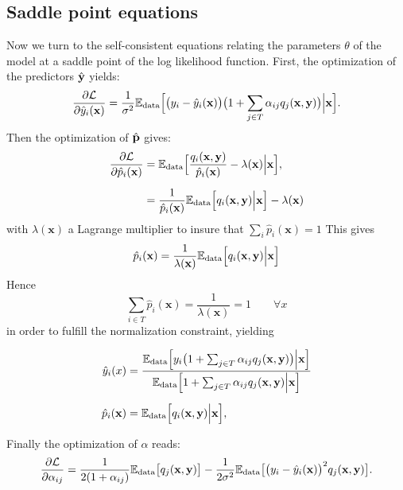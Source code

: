 \subsection*{Saddle point equations}
Now we turn to the self-consistent equations relating the parameters $\theta$ 
of the model at a saddle point of the log likelihood function. First, the 
optimization of the predictors $\hat {\bf y}$ yields:
\[
\frac{\partial{\cal L}}{\partial \hat y_i(\mathbf{x})} = \frac{1}{\sigma^2}{\mathbb E}_{\rm data}\Bigl[ \bigl(y_i-\hat y_i(\mathbf{x})\bigr)\bigl(1+\sum_{j\in  T}\alpha_{ij}q_j(\mathbf{x},{\bf y})\bigr)\Big\vert \mathbf{x}\Bigr].
\]
Then the optimization of $\hat{\bf p}$ gives:
\begin{align*}
\frac{\partial{\cal L}}{\partial \hat p_i(\mathbf{x})} &= {\mathbb E}_{\rm data}\Bigl[\frac{q_i(\mathbf{x},{\bf y})}{\hat p_i(\mathbf{x})}-\lambda(\mathbf{x})\Big\vert \mathbf{x} \Bigr],\\[0.2cm]
&= \frac{1}{\hat p_i(\mathbf{x})}{\mathbb E}_{\rm data}\Bigl[q_i(\mathbf{x},{\bf y})\Big\vert \mathbf{x} \Bigr]-\lambda(\mathbf{x})
\end{align*}
with $\lambda(\mathbf{x})$ a Lagrange multiplier to insure that $\sum_i\hat p_i(\mathbf{x})=1$ 
This gives
\[
\hat p_i(\mathbf{x}) = \frac{1}{\lambda(\mathbf{x})}{\mathbb E}_{\rm data}
\Bigl[q_i(\mathbf{x},{\bf y})\Big\vert \mathbf{x} \Bigr]
\]
Hence
\[
\sum_{i\in T} \hat p_i(\mathbf{x}) = \frac{1}{\lambda(\mathbf{x})} = 1\qquad \forall x
\]
in order to fulfill the normalization constraint, yielding 

\begin{align}
  \hat y_i(x) &= 
    \frac{
      {\mathbb E}_{\rm data} \Bigl[
          y_i\bigl(1+\sum_{j\in T}\alpha_{ij}q_j(\mathbf{x},{\bf y})\bigr)\Big\vert \mathbf{x}
        \Bigr]
    }{
      {\mathbb E}_{\rm data}\Bigl[1+\sum_{j\in T}\alpha_{ij}q_j(\mathbf{x},{\bf y})\Big\vert \mathbf{x}\Bigr]
    }\label{eq:hyopt}\\[0.2cm]
  \hat p_i(\mathbf{x}) &= {\mathbb E}_{\rm data}\Bigl[q_i(\mathbf{x},{\bf y})\Big\vert \mathbf{x} \Bigr],\label{eq:tildep}
\end{align}

Finally the optimization of $\alpha$ reads:
\[
\frac{\partial{\cal L}}{\partial \alpha_{ij}} = \frac{1}{2(1+\alpha_{ij})}{\mathbb E}_{\rm data}\bigl[q_j(\mathbf{x},{\bf y})\bigr]-\frac{1}{2\sigma^2}
{\mathbb E}_{\rm data}\bigl[\bigl(y_i-\hat y_i(\mathbf{x})\bigr)^2q_j(\mathbf{x},{\bf y})\bigr].
\]
